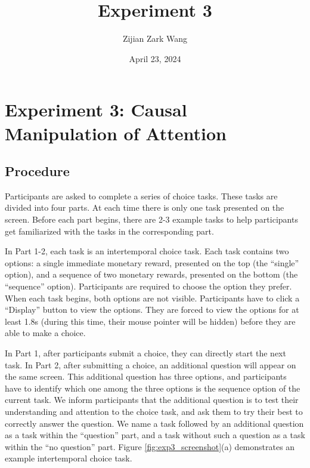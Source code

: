 \documentclass[
  12pt,
]{article}
\title{Experiment 3}
\author{Zijian Zark Wang}
\date{April 23, 2024}
\begin{document}
\maketitle

\hypertarget{experiment-3-causal-manipulation-of-attention}{%
\section{Experiment 3: Causal Manipulation of
Attention}\label{experiment-3-causal-manipulation-of-attention}}

\hypertarget{procedure}{%
\subsection{Procedure}\label{procedure}}

Participants are asked to complete a series of choice tasks. These tasks
are divided into four parts. At each time there is only one task
presented on the screen. Before each part begins, there are 2-3 example
tasks to help participants get familiarized with the tasks in the
corresponding part.

In Part 1-2, each task is an intertemporal choice task. Each task
contains two options: a single immediate monetary reward, presented on
the top (the ``single'' option), and a sequence of two monetary rewards,
presented on the bottom (the ``sequence'' option). Participants are
required to choose the option they prefer. When each task begins, both
options are not visible. Participants have to click a ``Display'' button
to view the options. They are forced to view the options for at least
1.8s (during this time, their mouse pointer will be hidden) before they
are able to make a choice.

In Part 1, after participants submit a choice, they can directly start
the next task. In Part 2, after submitting a choice, an additional
question will appear on the same screen. This additional question has
three options, and participants have to identify which one among the
three options is the sequence option of the current task. We inform
participants that the additional question is to test their understanding
and attention to the choice task, and ask them to try their best to
correctly answer the question. We name a task followed by an additional
question as a task within the ``question'' part, and a task without such
a question as a task within the ``no question'' part. Figure
\ref{fig:exp3_screenshot}(a) demonstrates an example intertemporal
choice task.
\end{document}

